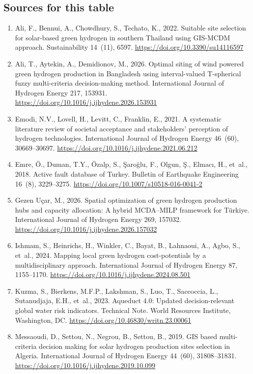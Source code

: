 \subsection*{Sources for this table}
\begin{enumerate}\setlength{\itemsep}{0pt}
\item Ali, F., Bennui, A., Chowdhury, S., Techato, K., 2022. Suitable site selection for solar-based green hydrogen in southern Thailand using GIS-MCDM approach. Sustainability 14~(11), 6597. \url{https://doi.org/10.3390/su14116597}
\item Ali, T., Aytekin, A., Demidionov, M., 2026. Optimal siting of wind powered green hydrogen production in Bangladesh using interval-valued T-spherical fuzzy multi-criteria decision-making method. International Journal of Hydrogen Energy 217, 153931. \url{https://doi.org/10.1016/j.ijhydene.2026.153931}
\item Emodi, N.V., Lovell, H., Levitt, C., Franklin, E., 2021. A systematic literature review of societal acceptance and stakeholders' perception of hydrogen technologies. International Journal of Hydrogen Energy 46~(60), 30669--30697. \url{https://doi.org/10.1016/j.ijhydene.2021.06.212}
\item Emre, {\"O}., Duman, T.Y., {\"O}zalp, S., {\c{S}}aro{\u{g}}lu, F., Olgun, {\c{S}}., Elmac{\i}, H., et~al., 2018. Active fault database of Turkey. Bulletin of Earthquake Engineering 16~(8), 3229--3275. \url{https://doi.org/10.1007/s10518-016-0041-2}
\item Gezen U{\c{c}}ar, M., 2026. Spatial optimization of green hydrogen production hubs and capacity allocation: A hybrid MCDA--MILP framework for T{\"u}rkiye. International Journal of Hydrogen Energy 269, 157032. \url{https://doi.org/10.1016/j.ijhydene.2026.157032}
\item Ishmam, S., Heinrichs, H., Winkler, C., Bayat, B., Lahnaoui, A., Agbo, S., et~al., 2024. Mapping local green hydrogen cost-potentials by a multidisciplinary approach. International Journal of Hydrogen Energy 87, 1155--1170. \url{https://doi.org/10.1016/j.ijhydene.2024.08.501}
\item Kuzma, S., Bierkens, M.F.P., Lakshman, S., Luo, T., Saccoccia, L., Sutanudjaja, E.H., et~al., 2023. Aqueduct 4.0: Updated decision-relevant global water risk indicators. Technical Note. World Resources Institute, Washington, DC. \url{https://doi.org/10.46830/writn.23.00061}
\item Messaoudi, D., Settou, N., Negrou, B., Settou, B., 2019. GIS based multi-criteria decision making for solar hydrogen production sites selection in Algeria. International Journal of Hydrogen Energy 44~(60), 31808--31831. \url{https://doi.org/10.1016/j.ijhydene.2019.10.099}

\end{enumerate}
